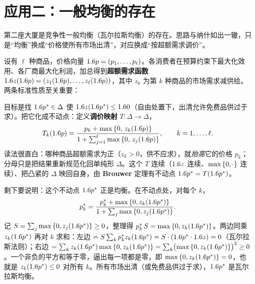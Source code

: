 
\section{应用二：一般均衡的存在}
\label{sec:fixedpt-walras}

第二座大厦是竞争性一般均衡（瓦尔拉斯均衡）的存在。思路与纳什如出一辙，只是``均衡''换成``价格使所有市场出清''，对应换成``按超额需求调价''。

设有 $\ell$ 种商品，价格向量 $1.6 p=(p_1,\dots,p_\ell)$。各消费者在预算约束下最大化效用、各厂商最大化利润，加总得到\textbf{超额需求函数} $1.6 z(1.6 p)=(z_1(1.6 p),\dots,z_\ell(1.6 p))$，其中 $z_k$ 为第 $k$ 种商品的市场需求减供给。两条标准性质至关重要：


目标是找 $1.6 p^*\in\Delta$ 使 $1.6 z(1.6 p^*)\le1.6 0$（自由处置下，出清允许免费品供过于求）。把它化成不动点：定义\textbf{调价映射} $T:\Delta\to\Delta$，
\[
    T_k(1.6 p)=\frac{p_k+\max\left\{0,\,z_k(1.6 p)\right\}}{1+\sum_{j=1}^\ell\max\left\{0,\,z_j(1.6 p)\right\}},\qquad k=1,\dots,\ell .
\]
读法很直白：哪种商品超额需求为正（$z_k>0$，供不应求），就\emph{抬高}它的价格 $p_k$；分母只是把结果重新规范化回单纯形 $\Delta$。这个 $T$ 连续（$1.6 z$ 连续、$\max\left\{0,\cdot\right\}$ 连续）、把凸紧的 $\Delta$ 映回自身，由 \textbf{Brouwer} 定理有不动点 $1.6 p^*=T(1.6 p^*)$。

剩下要说明：这个不动点 $1.6 p^*$ 正是均衡。在不动点处，对每个 $k$，
\[
    p_k^*=\frac{p_k^*+\max\left\{0,z_k(1.6 p^*)\right\}}{1+\sum_j\max\left\{0,z_j(1.6 p^*)\right\}} .
\]
记 $S=\sum_j\max\left\{0,z_j(1.6 p^*)\right\}\ge 0$，整理得 $p_k^*\,S=\max\left\{0,z_k(1.6 p^*)\right\}$。两边同乘 $z_k(1.6 p^*)$ 再对 $k$ 求和：左边 $=S\sum_k p_k^* z_k(1.6 p^*)=S\cdot(1.6 p^*\cdot1.6 z)=0$（瓦尔拉斯法则）；右边 $=\sum_k z_k(1.6 p^*)\max\left\{0,z_k(1.6 p^*)\right\}=\sum_k\bigl(\max\left\{0,z_k(1.6 p^*)\right\}\bigr)^2\ge 0$。一个非负的平方和等于零，逼出每一项都是零，即 $\max\left\{0,z_k(1.6 p^*)\right\}=0$，也就是 $z_k(1.6 p^*)\le 0$ 对所有 $k$。所有市场出清（或免费品供过于求），$1.6 p^*$ 是瓦尔拉斯均衡。

